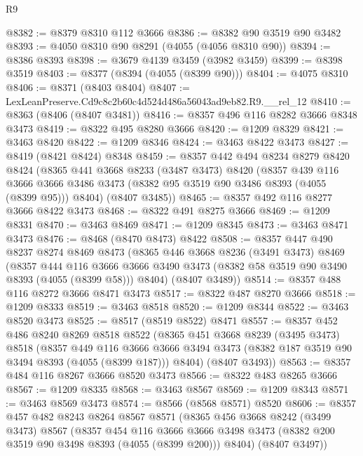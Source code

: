 \begin{lexlean}{R9}
\begin{coremodule}
@8382 := @8379 @8310 @112 @3666
@8386 := @8382 @90 @3519 @90 @3482
@8393 := @4050 @8310 @90 @8291 (@4055 (@4056 @8310 @90))
@8394 := @8386 @8393
@8398 := @3679 @4139 @3459 (@3982 @3459)
@8399 := @8398 @3519
@8403 := @8377 (@8394 (@4055 (@8399 @90)))
@8404 := @4075 @8310
@8406 := @8371 (@8403 @8404)
@8407 := LexLeanPreserve.Cd9c8c2b60c4d524d486a56043ad9eb82.R9.__rel_12
@8410 := @8363 (@8406 (@8407 @3481))
@8416 := @8357 @496 @116 @8282 @3666 @8348 @3473
@8419 := @8322 @495 @8280 @3666
@8420 := @1209 @8329
@8421 := @3463 @8420
@8422 := @1209 @8346
@8424 := @3463 @8422 @3473
@8427 := @8419 (@8421 @8424) @8348
@8459 := @8357
    @442
    @494
    @8234
    @8279
    @8420
    @8424
    (@8365
      @441
      @3668
      @8233
      (@3487 @3473)
      @8420
      (@8357
        @439
        @116
        @3666
        @3666
        @3486
        @3473
        (@8382 @95 @3519 @90 @3486 @8393 (@4055 (@8399 @95)))
        @8404)
      (@8407 @3485))
@8465 := @8357 @492 @116 @8277 @3666 @8422 @3473
@8468 := @8322 @491 @8275 @3666
@8469 := @1209 @8331
@8470 := @3463 @8469
@8471 := @1209 @8345
@8473 := @3463 @8471 @3473
@8476 := @8468 (@8470 @8473) @8422
@8508 := @8357
    @447
    @490
    @8237
    @8274
    @8469
    @8473
    (@8365
      @446
      @3668
      @8236
      (@3491 @3473)
      @8469
      (@8357
        @444
        @116
        @3666
        @3666
        @3490
        @3473
        (@8382 @58 @3519 @90 @3490 @8393 (@4055 (@8399 @58)))
        @8404)
      (@8407 @3489))
@8514 := @8357 @488 @116 @8272 @3666 @8471 @3473
@8517 := @8322 @487 @8270 @3666
@8518 := @1209 @8333
@8519 := @3463 @8518
@8520 := @1209 @8344
@8522 := @3463 @8520 @3473
@8525 := @8517 (@8519 @8522) @8471
@8557 := @8357
    @452
    @486
    @8240
    @8269
    @8518
    @8522
    (@8365
      @451
      @3668
      @8239
      (@3495 @3473)
      @8518
      (@8357
        @449
        @116
        @3666
        @3666
        @3494
        @3473
        (@8382 @187 @3519 @90 @3494 @8393 (@4055 (@8399 @187)))
        @8404)
      (@8407 @3493))
@8563 := @8357 @484 @116 @8267 @3666 @8520 @3473
@8566 := @8322 @483 @8265 @3666
@8567 := @1209 @8335
@8568 := @3463 @8567
@8569 := @1209 @8343
@8571 := @3463 @8569 @3473
@8574 := @8566 (@8568 @8571) @8520
@8606 := @8357
    @457
    @482
    @8243
    @8264
    @8567
    @8571
    (@8365
      @456
      @3668
      @8242
      (@3499 @3473)
      @8567
      (@8357
        @454
        @116
        @3666
        @3666
        @3498
        @3473
        (@8382 @200 @3519 @90 @3498 @8393 (@4055 (@8399 @200)))
        @8404)
      (@8407 @3497))

\end{coremodule}
\end{lexlean}
